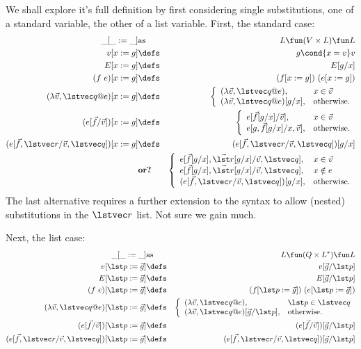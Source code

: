 We shall explore it's full definition by first considering single substitutions,
one of a standard variable, the other of a list variable.
First, the standard case:
\begin{eqnarray*}
   \_[\_:=\_] &\mbox{as}& L \fun (V \times L) \fun L
\\ v[x:=g] &\defs&  g \cond{x=v} v
\\ E[x:=g] &\defs&  E[g/x]
\\ (f~e)[x:=g] &\defs& (f[x:=g])~(e[x:=g])
\\ (\lambda \vec v,\lstvec q @ e)[x:=g]
   &\defs&
   \left\{
     \begin{array}{ll}
       (\lambda \vec v,\lstvec q @ e), & x \in \vec v \\
       (\lambda \vec v,\lstvec q @ e)[g/x], & \hbox{otherwise.}
     \end{array}
   \right.
\\ (e[\vec f/\vec v])[x:=g]
   &\defs&
   \left\{
     \begin{array}{ll}
       e[\vec f[g/x]/\vec v], & x \in \vec v \\
       e[g,\vec f[g/x]/x,\vec v], & \hbox{otherwise.}
     \end{array}
   \right.
\\ (e[\vec f,\lstvec r/\vec v,\lstvec q])[x:=g]
   &\defs&
   (e[\vec f,\lstvec r/\vec v,\lstvec q])[g/x]
\\&\textbf{or?}&
   \left\{
     \begin{array}{ll}
       e[\vec f[g/x],\vec{\lst r}[g/x]/\vec v,\lstvec q], & x \in \vec v \\
       e[\vec f[g/x],\vec{\lst r}[g/x]/\vec v,\lstvec q], & x \notin e \\
       (e[\vec f,\lstvec r/\vec v,\lstvec q])[g/x], & \hbox{otherwise.}
     \end{array}
   \right.
\end{eqnarray*}
The last alternative requires a further extension to the syntax to
allow (nested) substitutions in the $\lstvec r$ list. Not sure we gain much.

Next, the list case:
\begin{eqnarray*}
   \_[\_:=\_] &\mbox{as}& L \fun (Q \times L^*) \fun L
\\ v[\lst p:=\vec g] &\defs&  v[\vec g/\lst p]
\\ E[\lst p:=\vec g] &\defs&  E[\vec g/\lst p]
\\ (f~e)[\lst p:=\vec g] &\defs& (f[\lst p:=\vec g])~(e[\lst p:=\vec g])
\\ (\lambda \vec v,\lstvec q @ e)[\lst p:=\vec g]
   &\defs&
   \left\{
     \begin{array}{ll}
       (\lambda \vec v,\lstvec q @ e), & \lst p \in \lstvec q \\
       (\lambda \vec v,\lstvec q @ e)[\vec g/\lst p], & \hbox{otherwise.}
     \end{array}
   \right.
\\ (e[\vec f/\vec v])[\lst p:=\vec g]
   &\defs&
   (e[\vec f/\vec v])[\vec g/\lst p]
\\ (e[\vec f,\lstvec r/\vec v,\lstvec q])[\lst p:=\vec g]
   &\defs&
   (e[\vec f,\lstvec r/\vec v,\lstvec q])[\vec g/\lst p]
\end{eqnarray*}

